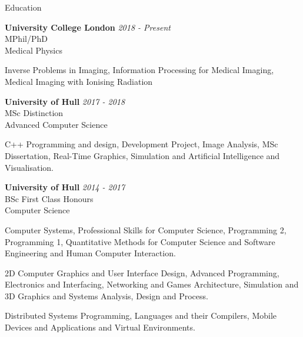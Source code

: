 \documentclass{cv}
\begin{document}

\begin{rSection}{Education}

{\bf University College London} \hfill {\em 2018 - Present} 
\\ MPhil/PhD
\\ Medical Physics

\item Inverse Problems in Imaging, Information Processing for Medical Imaging, Medical Imaging with Ionising Radiation

{\bf University of Hull} \hfill {\em 2017 - 2018} 
\\ MSc \hfill {Distinction}
\\ Advanced Computer Science

\item C++ Programming and design, Development Project, Image Analysis, MSc Dissertation, Real-Time Graphics, Simulation and Artificial Intelligence and Visualisation.

{\bf University of Hull} \hfill {\em 2014 - 2017} 
\\ BSc \hfill {First Class Honours}
\\ Computer Science

\item Computer Systems, Professional Skills for Computer Science, Programming 2, Programming 1, Quantitative Methods for Computer Science and Software Engineering and Human Computer Interaction.

\item 2D Computer Graphics and User Interface Design, Advanced Programming, Electronics and Interfacing, Networking and Games Architecture, Simulation and 3D Graphics and Systems Analysis, Design and Process.

\item Distributed Systems Programming, Languages and their Compilers, Mobile Devices and Applications and Virtual Environments.

\end{rSection}

\end{document}
